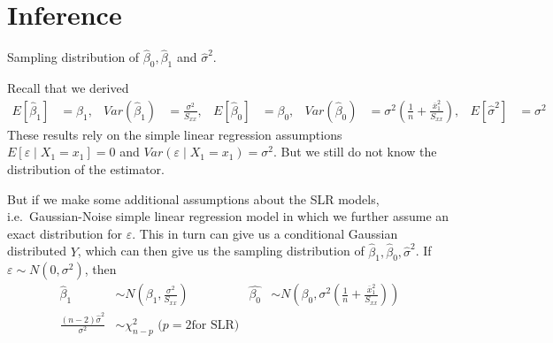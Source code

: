 \documentclass[12 pt]{article}
\begin{document}
  \section{Inference}
  Sampling distribution of $\hat{\beta}_0, \hat{\beta}_1$ and
    $\hat{\sigma}^2$.

    Recall that we derived
    \begin{align*}
      E[\hat{\beta}_1] & = \beta_1, & Var(\hat{\beta}_1) & = \frac{\sigma^2}{S_{xx}}, & E[\hat{\beta}_0] & = \beta_0, & Var(\hat{\beta}_0) & = \sigma^2 \left(\frac{1}{n} + \frac{\overline{x}_1^2}{S_{xx}}\right), & E[\hat{\sigma}^2] & = \sigma^2
    \end{align*}
    These results rely on the simple linear regression assumptions
    $E[\varepsilon \mid X_1 = x_1] =0$ and $Var(\varepsilon \mid X_1 =
    x_1) = \sigma^2$. But we still do not know the distribution of the
    estimator.

    But if we make some additional assumptions about the SLR models,
    i.e.\ Gaussian-Noise simple linear regression model in which we
    further assume an exact distribution for $\varepsilon$. This in
    turn can give us a conditional Gaussian distributed $Y$, which can
    then give us the sampling distribution of $\hat{\beta}_1,
    \hat{\beta}_0, \hat{\sigma}^2$. If $\varepsilon \sim N(0,
    \sigma^2)$, then
    \begin{align*}
      \hat{\beta}_1 & \sim N\left(\beta_1, \frac{\sigma^2}{S_{xx}}\right) & \hat{\beta_0} & \sim N \left(\beta_0, \sigma^2 \left(\frac{1}{n} + \frac{\overline{x}_1^2}{S_{xx}}\right)\right)
      \\ \frac{(n-2)\hat{\sigma}^2}{\sigma^2} & \sim \chi^2_{n-p}
                                                       \text{ ($p = 2$
                                                       for SLR)}
    \end{align*}
\end{document}

